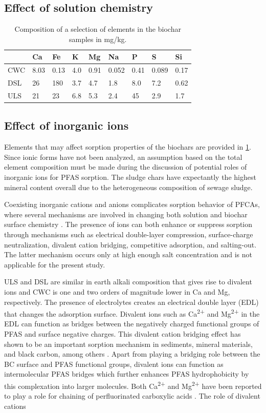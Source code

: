 \subsection{Effect of solution chemistry}

\begin{table}
\centering
\caption{Composition of a selection of elements in the biochar samples in mg/kg.}
\label{tab:BC_mainElements}
\begin{tabular}{lllllllll} \toprule
 & Ca & Fe & K & Mg & Na & P & S & Si \\ \midrule
CWC & 8.03 & 0.13 & 4.0 & 0.91 & 0.052 & 0.41 & 0.089 & 0.17 \\
DSL & 26 & 180 & 3.7 & 4.7 & 1.8 & 8.0 & 7.2 & 0.62 \\
ULS & 21 & 23 & 6.8 & 5.3 & 2.4 & 45 & 2.9 & 1.7 \\ \bottomrule
\end{tabular}
\end{table}

\subsection{Effect of inorganic ions}
Elements that may affect sorption properties of the biochars are provided in \cref{tab:BC_mainElements}. Since ionic forms have not been analyzed, an assumption based on the total element composition must be made during the discussion of potential roles of inorganic ions for PFAS sorption. The sludge chars have expectantly the highest mineral content overall due to the heterogeneous composition of sewage sludge. 

Coexisting inorganic cations and anions complicates sorption behavior of PFCAs, where several mechanisms are involved in changing both solution and biochar surface chemistry \citep{du2014adsorption}. The presence of ions can both enhance or suppress sorption through mechanisms such as electrical double-layer compression, surface-charge neutralization, divalent cation bridging, competitive adsorption, and salting-out. The latter mechanism occurs only at high enough salt concentration and is not applicable for the present study. 

ULS and DSL are similar in earth alkali composition that gives rise to divalent ions  and CWC is one and two orders of magnitude lower in Ca and Mg, respectively. The presence of electrolytes creates an electrical double layer (EDL) that changes the adsorption surface. Divalent ions such as Ca\textsuperscript{2+} and Mg\textsuperscript{2+} in the EDL can function as bridges between the negatively charged functional groups of PFAS and surface negative charges. This divalent cation bridging effect has shown to be an important sorption mechanism in sediments, mineral materials, and black carbon, among others \citep{higgins2006sorption}. Apart from playing a bridging role between the BC surface and PFAS functional groups, divalent ions can function as intermolecular PFAS bridges which further enhances PFAS hydrophobicity by this complexation into larger molecules. Both Ca\textsuperscript{2+} and Mg\textsuperscript{2+} have been reported to play a role for chaining of perfluorinated carboxylic acids \citep{wang2011}. The role of divalent cations  

